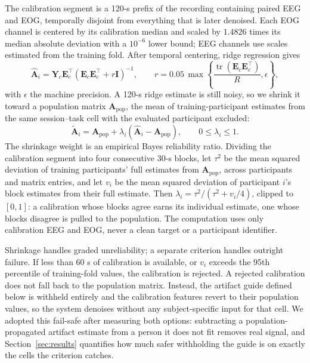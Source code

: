 The calibration segment is a 120-s prefix of the recording containing paired EEG and EOG, temporally disjoint from everything that is later denoised. Each EOG channel is centered by its calibration median and scaled by $1.4826$ times its median absolute deviation with a $10^{-6}$ lower bound; EEG channels use scales estimated from the training fold. After temporal centering, ridge regression gives
\begin{equation}
  \widehat{\mathbf{A}}_i=\mathbf{Y}_c\mathbf{E}_c^\top
  \left(\mathbf{E}_c\mathbf{E}_c^\top+r\mathbf{I}\right)^{-1},
  \qquad
  r=0.05\,\max\!\left\{
  \frac{\operatorname{tr}(\mathbf{E}_c\mathbf{E}_c^\top)}{R},\epsilon\right\},
  \label{eq:ridge}
\end{equation}
with $\epsilon$ the machine precision. A 120-s ridge estimate is still noisy, so we shrink it toward a population matrix $\mathbf{A}_{\mathrm{pop}}$, the mean of training-participant estimates from the same session--task cell with the evaluated participant excluded:
\begin{equation}
  \widetilde{\mathbf{A}}_i=
  \mathbf{A}_{\mathrm{pop}}+\lambda_i
  (\widehat{\mathbf{A}}_i-\mathbf{A}_{\mathrm{pop}}),
  \qquad 0\leq\lambda_i\leq1.
  \label{eq:shrinkage}
\end{equation}
The shrinkage weight is an empirical Bayes reliability ratio. Dividing the calibration segment into four consecutive 30-s blocks, let $\tau^2$ be the mean squared deviation of training participants' full estimates from $\mathbf{A}_{\mathrm{pop}}$, across participants and matrix entries, and let $v_i$ be the mean squared deviation of participant $i$'s block estimates from their full estimate. Then $\lambda_i=\tau^2/(\tau^2+v_i/4)$, clipped to $[0,1]$: a calibration whose blocks agree earns its individual estimate, one whose blocks disagree is pulled to the population. The computation uses only calibration EEG and EOG, never a clean target or a participant identifier.

Shrinkage handles graded unreliability; a separate criterion handles outright failure. If less than 60 s of calibration is available, or $v_i$ exceeds the 95th percentile of training-fold values, the calibration is rejected. A rejected calibration does not fall back to the population matrix. Instead, the artifact guide defined below is withheld entirely and the calibration features revert to their population values, so the system denoises without any subject-specific input for that cell. We adopted this fail-safe after measuring both options: subtracting a population-propagated artifact estimate from a person it does not fit removes real signal, and Section~\ref{sec:results} quantifies how much safer withholding the guide is on exactly the cells the criterion catches.

